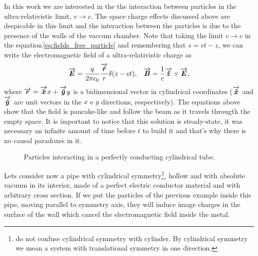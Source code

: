 \begin{apendicesenv}
    In this work we are interested in the the interaction between particles in the ultra-relativistic limit, $v \to c$. The space charge effects discussed above are despicable in this limit and the interaction between the particles is due to the presence of the walls of the vaccum chamber. Note that taking the limit $v \to c$ in the equation\,\ref{eq:fields_free_particle} and remembering that $s = vt - z$, we can write the electromagnetic field of a ultra-relativistic charge as
    \begin{align}
    	\overrightarrow{\boldsymbol{E}} =
		\frac{q}{2\pi\epsilon_0}\frac{\overrightarrow{\boldsymbol{\hat{r}}}}{r}\delta(z-ct), &
		& \overrightarrow{\boldsymbol{B}} =\frac{1}{c}\overrightarrow{\boldsymbol{\hat{z}}}\times\overrightarrow{\boldsymbol{E}},
    \end{align}
    where $\overrightarrow{\boldsymbol{r}} = \overrightarrow{\boldsymbol{\hat{x}}}x + \overrightarrow{\boldsymbol{\hat{y}}}y$ is a bidimensional vector in cylindrical coordinates ($\overrightarrow{\boldsymbol{\hat{x}}}$ and $\overrightarrow{\boldsymbol{\hat{y}}}$ are unit vectors in the $x$ e $y$ directions, respectively). The equations above show that the field is pancake-like and follow the beam as it travels througth the empty space. It is important to notice that this solution is steady-state, it was necessary an infinite amount of time before $t$ to build it and that's why there is no causal paradoxes in it.

    \begin{figure}[hb!]
	    \centering
	    \label{fig:wake2}
	    \caption{Particles interacting in a perfectly conducting cylindrical tube.}
    \end{figure}

    Lets consider now a pipe with cylindrical symmetry\footnote{do not confuse cylindrical symmetry with cylinder. By cylindrical symmetry we mean a system with translational symmetry in one direction.}, hollow and with absolute vacuum in its interior, made of a perfect electric conductor material and with arbitrary cross section. If we put the particles of the previous example inside this pipe, moving parallel to symmetry axis, they will induce image charges in the surface of the wall which cancel the electromagnetic field inside the metal.


\end{apendicesenv}
